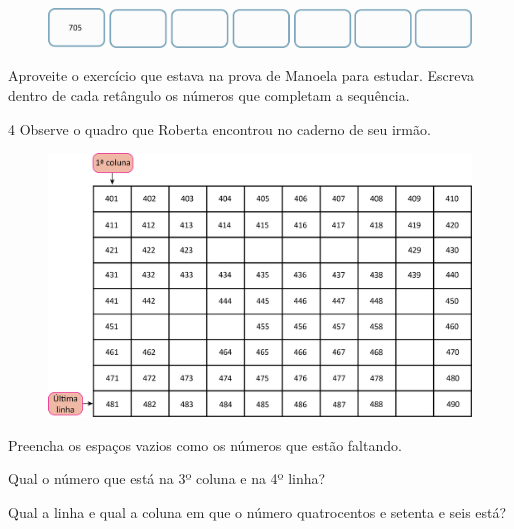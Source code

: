 \begin{figure}[htpb!]
\includegraphics[width=\textwidth]{./media/image29.png}
\end{figure}

Aproveite o exercício que estava na prova de Manoela para estudar.
Escreva dentro de cada retângulo os números que completam a sequência.

\num{4} Observe o quadro que Roberta encontrou no caderno de seu irmão.

\begin{figure}[htpb!]
\includegraphics[width=\textwidth]{./media/image30.png}
\end{figure}

\begin{escolha}
\item Preencha os espaços vazios como os números que estão faltando.


\item Qual o número que está na 3º coluna e na 4º linha?

\item Qual a linha e qual a coluna em que o número quatrocentos e setenta e seis está?
\end{escolha}

